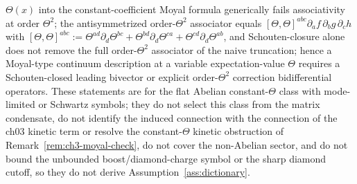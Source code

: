 \(\Theta(x)\) into the constant-coefficient Moyal formula generically fails associativity
at order \(\Theta^2\); the antisymmetrized order-\(\Theta^2\) associator equals
\([\Theta,\Theta]^{abc}\partial_af\,\partial_bg\,\partial_ch\) with
\([\Theta,\Theta]^{abc}:=\Theta^{ad}\partial_d\Theta^{bc}
+\Theta^{bd}\partial_d\Theta^{ca}+\Theta^{cd}\partial_d\Theta^{ab}\), and
Schouten-closure alone does not remove the full order-\(\Theta^2\) associator of the
naive truncation; hence a Moyal-type continuum description at a variable
expectation-value \(\Theta\) requires a Schouten-closed leading bivector or explicit
order-\(\Theta^2\) correction bidifferential operators. These statements are for the
flat Abelian constant-\(\Theta\) class with mode-limited or Schwartz symbols; they do
not select this class from the matrix condensate, do not identify the induced connection
with the connection of the ch03 kinetic term or resolve the constant-\(\Theta\) kinetic
obstruction of Remark~\ref{rem:ch3-moyal-check}, do not cover the non-Abelian sector, and
do not bound the unbounded boost/diamond-charge symbol or the sharp diamond cutoff, so
they do not derive Assumption~\ref{ass:dictionary}.

